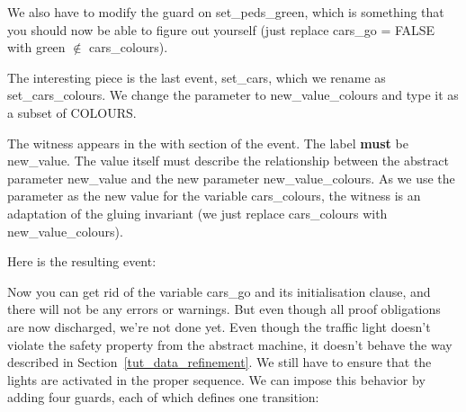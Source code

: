 We also have to modify the guard on \textsf{set\_peds\_green}, which is something that you should now be able to figure out yourself (just replace \textsf{cars\_go = FALSE} with \textsf{green} $\notin$ \textsf{cars\_colours}).

The interesting piece is the last event, \textsf{set\_cars}, which we rename as \textsf{set\_cars\-\_colours}.  We change the parameter to \textsf{new\_value\_colours} and type it as a subset of \textsf{COLOURS}.

The witness appears in the \textsf{with} section of the event.  The label \textbf{must} be \textsf{new\_value}.  The value itself must describe the relationship between the abstract parameter \textsf{new\_value} and the new parameter \textsf{new\_value\_colours}.  As we use the parameter as the new value for the variable \textsf{cars\_colours}, the witness is an adaptation of the gluing invariant (we just replace \textsf{cars\_colours} with \textsf{new\_value\_colours}).


Here is the resulting event:


Now you can get rid of the variable \textsf{cars\_go} and its initialisation clause, and there will not be any errors or warnings. But even though all proof obligations are now discharged, we're not done yet. Even though the traffic light doesn't violate the safety property from the abstract machine, it doesn't behave the way described in Section~\ref{tut_data_refinement}.  We still have to ensure that the lights are activated in the proper sequence.  We can impose this behavior by adding four guards, each of which defines one transition:

